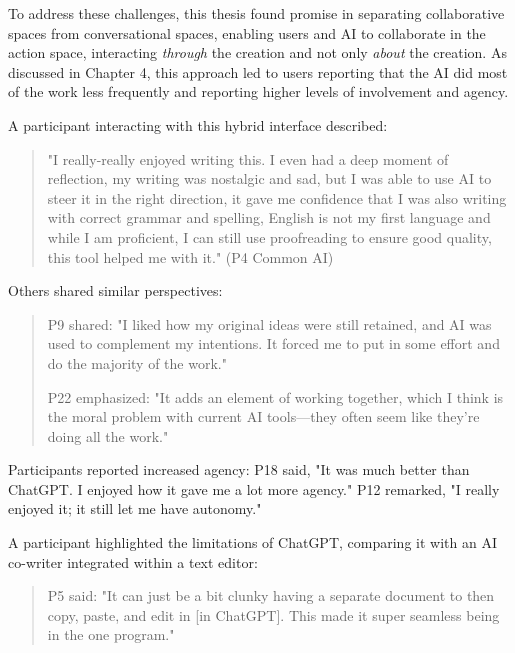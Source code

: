 To address these challenges, this thesis found promise in separating collaborative spaces from conversational spaces, enabling users and AI to collaborate in the action space, interacting \textit{through} the creation and not only \textit{about} the creation. As discussed in Chapter 4, this approach led to users reporting that the AI did most of the work less frequently and reporting higher levels of involvement and agency.

A participant interacting with this hybrid interface described:

\begin{quote}
"I really-really enjoyed writing this. I even had a deep moment of reflection, my writing was nostalgic and sad, but I was able to use AI to steer it in the right direction, it gave me confidence that I was also writing with correct grammar and spelling, English is not my first language and while I am proficient, I can still use proofreading to ensure good quality, this tool helped me with it." (P4 Common AI)
\end{quote}

Others shared similar perspectives:

\begin{quote}
P9 shared: "I liked how my original ideas were still retained, and AI was used to complement my intentions. It forced me to put in some effort and do the majority of the work."

P22 emphasized: "It adds an element of working together, which I think is the moral problem with current AI tools—they often seem like they're doing all the work."
\end{quote}

Participants reported increased agency: P18 said, "It was much better than ChatGPT. I enjoyed how it gave me a lot more agency." P12 remarked, "I really enjoyed it; it still let me have autonomy."

A participant highlighted the limitations of ChatGPT, comparing it with an AI co-writer integrated within a text editor:

\begin{quote}
P5 said: "It can just be a bit clunky having a separate document to then copy, paste, and edit in [in ChatGPT]. This made it super seamless being in the one program."
\end{quote}

